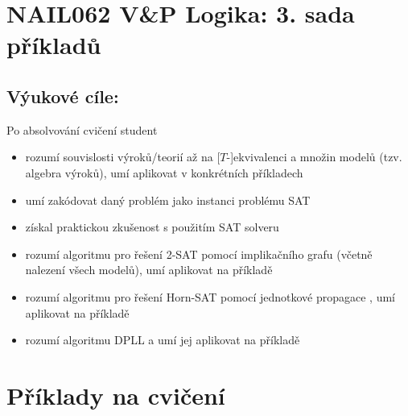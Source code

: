 \documentclass[a4paper,11pt]{amsart}
\begin{document}
\section*{NAIL062 V\&P Logika: 3. sada příkladů}



\subsection*{Výukové cíle:} Po absolvování cvičení student

    \begin{itemize}\setlength{\itemsep}{0pt}
        \item rozumí souvislosti výroků/teorií až na [$T$-]ekvivalenci a množin modelů (tzv. algebra výroků), umí aplikovat v konkrétních příkladech
        \item umí zakódovat daný problém jako instanci problému SAT
        \item získal praktickou zkušenost s použitím SAT solveru
        \item rozumí algoritmu pro řešení 2-SAT pomocí implikačního grafu (včetně nalezení všech modelů), umí aplikovat na příkladě
        \item rozumí algoritmu pro řešení Horn-SAT pomocí jednotkové propagace , umí aplikovat na příkladě
        \item rozumí algoritmu DPLL a umí jej aplikovat na příkladě
    \end{itemize}
    

\section*{Příklady na cvičení}
\end{document}
